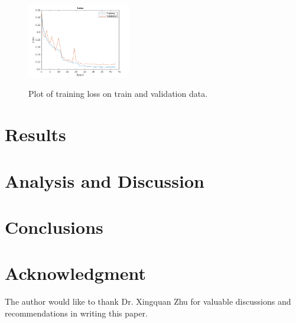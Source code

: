 \documentclass[conference]{IEEEtran}
\begin{document}
\begin{figure}
\centering
\includegraphics[width=0.4\textwidth]{figures/training_loss.png}
\label{training_loss}
\caption{Plot of training loss on train and validation data.}
\end{figure}

\section{Results}

\section{Analysis and Discussion}

\section{Conclusions}

\section*{Acknowledgment}
The author would like to thank Dr. Xingquan Zhu for valuable discussions and recommendations in writing this paper.


\end{document}
